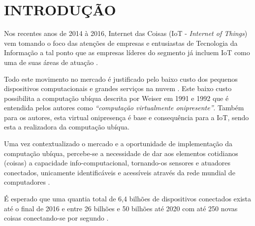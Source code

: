 \chapter[INTRODUÇÃO]{INTRODUÇÃO}

Nos recentes anos de 2014 à 2016, Internet das Coisas (IoT - \textit{Internet of
Things}) vem tomando o foco das atenções de empresas e entusiastas de Tecnologia
da Informação \cite{DzoneIoT:2015} a tal ponto que as empresas líderes do
segmento já incluem IoT como uma de suas áreas de atuação \cite{Ibm2016}
\cite{ARM-mbed} \cite{Microsoft2016} \cite{Intel2016} \cite{Oracle2016}
\cite{Google2016} \cite{AmazonIoT2016}.

Todo este movimento no mercado é justificado pelo baixo custo dos pequenos
dispositivos computacionais \cite{RpiZeroLaunch} \cite{Esp8266.net} e grandes
serviços na nuvem \cite{Kaufmann2015} \cite{Amazon2016}. Este baixo custo
possibilita a computação ubíqua descrita por Weiser em 1991 e 1992
\cite{Weiser1999} que é entendida pelos autores como \textit{``computação
virtualmente onipresente''}. Também para os autores, esta virtual onipresença é
base e consequência para a IoT, sendo esta a realizadora da computação ubíqua.

Uma vez contextualizado o mercado e a oportunidade de implementação da
computação ubíqua, percebe-se a necessidade de dar aos elementos cotidianos
(coisas) a capacidade info-computacional, tornando-os sensores e atuadores
conectados, unicamente identificáveis e acessíveis através da rede mundial de
computadores \cite{Lemos2013} \cite{Kranenburg2012}.

É esperado que uma quantia total de 6,4 bilhões de dispositivos conectados
exista até o final de 2016 \cite{GARTNER2015} e entre 26 bilhões
\cite{GARTNER2014} e 50 bilhões até 2020 com até 250 novas coisas conectando-se
por segundo \cite{CiscoBlog2013}.
